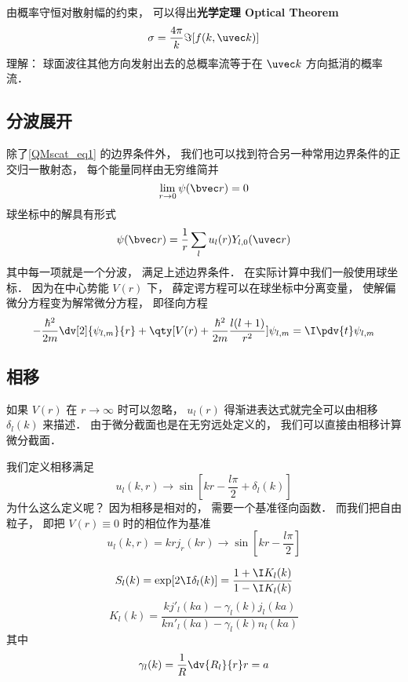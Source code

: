 由概率守恒对散射幅的约束， 可以得出\textbf{光学定理 Optical Theorem}
\begin{equation}
\sigma = \frac{4\pi}{k} \Im[f(k, \uvec k)]
\end{equation}
理解： 球面波往其他方向发射出去的总概率流等于在 $\uvec k$ 方向抵消的概率流．

\subsection{分波展开}
除了\autoref{QMscat_eq1} 的边界条件外， 我们也可以找到符合另一种常用边界条件的正交归一散射态， 每个能量同样由无穷维简并
\begin{equation}
\lim_{r\to 0} \psi(\bvec r) = 0
\end{equation}
球坐标中的解具有形式
\begin{equation}
\psi(\bvec r) = \frac{1}{r} \sum_l u_l(r) Y_{l,0}(\uvec r)
\end{equation}
其中每一项就是一个分波， 满足上述边界条件． 在实际计算中我们一般使用球坐标． 因为在中心势能 $V(r)$ 下， 薛定谔方程可以在球坐标中分离变量， 使解偏微分方程变为解常微分方程， 即径向方程
\begin{equation}
-\frac{\hbar^2}{2m} \dv[2]{\psi_{l,m}}{r} + \qty[V(r) + \frac{\hbar^2}{2m}\frac{l(l + 1)}{r^2}]\psi_{l,m} = \I \pdv{t} \psi_{l,m}
\end{equation}

\subsection{相移}
如果 $V(r)$ 在 $r\to\infty$ 时可以忽略， $u_l(r)$ 得渐进表达式就完全可以由相移 $\delta_l(k)$ 来描述． 由于微分截面也是在无穷远处定义的， 我们可以直接由相移计算微分截面．

我们定义相移满足
\begin{equation}
u_l(k, r) \to \sin[kr - \frac{l\pi}{2} + \delta_l(k)]
\end{equation}
为什么这么定义呢？ 因为相移是相对的， 需要一个基准径向函数． 而我们把自由粒子， 即把 $V(r) \equiv 0$ 时的相位作为基准
\begin{equation}
u_l(k, r) = kr j_r(kr) \to \sin[kr - \frac{l\pi}{2}]
\end{equation}



\begin{equation}
S_l(k) = \exp[2\I\delta_l(k)] = \frac{1 + \I K_l(k)}{1 - \I K_l(k)}
\end{equation}
\begin{equation}
K_l(k) = \frac{kj'_l(ka) - \gamma_l(k) j_l(ka)}{kn'_l(ka) - \gamma_l(k) n_l(ka)}
\end{equation}
其中
\begin{equation}
\gamma_l(k) = \frac{1}{R} \dv{R_l}{r} r = a
\end{equation}

